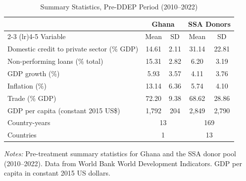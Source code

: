 \begin{table}[t]
\centering
\caption{Summary Statistics, Pre-DDEP Period (2010--2022)}
\label{tab:summary}
\begin{tabular}{lcccc}
\toprule
 & \multicolumn{2}{c}{Ghana} & \multicolumn{2}{c}{SSA Donors} \\
\cmidrule(lr){2-3} \cmidrule(lr){4-5}
Variable & Mean & SD & Mean & SD \\
\midrule
Domestic credit to private sector (\% GDP) & 14.61 & 2.11 & 31.14 & 22.81 \\
Non-performing loans (\% total) & 15.31 & 2.82 & 6.20 & 3.19 \\
GDP growth (\%) & 5.93 & 3.57 & 4.11 & 3.76 \\
Inflation (\%) & 13.14 & 6.36 & 5.74 & 4.10 \\
Trade (\% GDP) & 72.20 & 9.38 & 68.62 & 28.86 \\
GDP per capita (constant 2015 US\$) & 1,792 & 204 & 2,849 & 2,790 \\
\midrule
Country-years & \multicolumn{2}{c}{13} & \multicolumn{2}{c}{169} \\
Countries & \multicolumn{2}{c}{1} & \multicolumn{2}{c}{13} \\
\bottomrule
\end{tabular}
\begin{tablenotes}[flushleft]
\small
\item \textit{Notes:} Pre-treatment summary statistics for Ghana and the SSA donor pool (2010--2022). Data from World Bank World Development Indicators. GDP per capita in constant 2015 US dollars.
\end{tablenotes}
\end{table}
